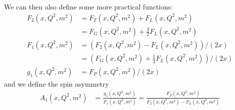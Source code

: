 We can then also define some more practical functions:
\begin{align}
F_{2}(x,Q^2,m^2) &= F_{T}(x,Q^2,m^2) + F_{L}(x,Q^2,m^2)\\
 &= F_{G}(x,Q^2,m^2) + \frac 3 2 F_{L}(x,Q^2,m^2)\\
F_1(x,Q^2,m^2) &= (F_{2}(x,Q^2,m^2)-F_L(x,Q^2,m^2))/(2x)\\
 &= \left(F_{G}(x,Q^2,m^2)+\frac 1 2 F_{L}(x,Q^2,m^2)\right)/(2x)\\
g_1(x,Q^2,m^2) &= F_{P}(x,Q^2,m^2)/(2x)
\end{align}
and we define the spin asymmetry
\begin{align}
A_1(x,Q^2,m^2) &= \frac{g_1(x,Q^2,m^2)}{F_1(x,Q^2,m^2)} = \frac{F_P(x,Q^2,m^2)}{F_2(x,Q^2,m^2)-F_L(x,Q^2,m^2)}
\end{align}
